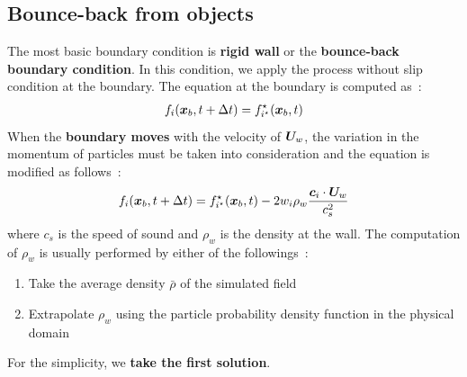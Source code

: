 \subsection{Bounce-back from objects}
The most basic boundary condition is 
{\bf rigid wall} or the {\bf bounce-back boundary condition}.
In this condition, we apply the process without
slip condition at the boundary.
The equation at the boundary is computed as~\cite{succi2018lattice}:
\begin{equation}
\begin{aligned}
  f_i(\boldsymbol{x}_b, t + \Delta t) = f_{i^\star}^\star(\boldsymbol{x}_b, t)
\end{aligned}
\label{discretized-rigid-wall}
\end{equation}
When the {\bf boundary moves} with the velocity of
$\boldsymbol{U}_w$, the variation in the momentum of particles
must be taken into consideration and the equation is
modified as follows~\cite{succi2018lattice}:
\begin{equation}
  \begin{aligned}
    f_i(\boldsymbol{x}_b, t + \Delta t) = f_{i^\star}^\star (\boldsymbol{x}_b, t) - 
    2 w_i \rho_w \frac{
      \boldsymbol{c}_i \cdot \boldsymbol{U}_w
    }{c_s^2}
  \end{aligned}
  \label{discretized-moving-wall}
\end{equation}
where $c_s$ is the speed of sound and 
$\rho_w$ is the density at the wall.
The computation of $\rho_w$ is usually performed by
either of the followings~\cite{zou1997pressure, khajepor2019study}:
\begin{enumerate}
  \item Take the average density $\bar{\rho}$ of the simulated field
  \item Extrapolate $\rho_w$ using 
  the particle probability density function in the physical domain
\end{enumerate}
For the simplicity, we {\bf take the first solution}.

